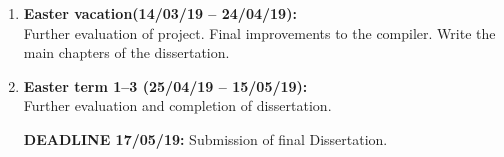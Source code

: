 \documentclass[12pt,a4paper,twoside]{article}
\begin{document}
\begin{enumerate}
\item \textbf{Easter vacation(14/03/19 -- 24/04/19):} \\
Further evaluation of project. Final improvements to the compiler.
Write the main chapters of the dissertation.

\item \textbf{Easter term 1--3 (25/04/19 -- 15/05/19):}  \\
Further evaluation and completion of dissertation.

\textbf{DEADLINE 17/05/19:} Submission of final Dissertation. \\

\end{enumerate}
\end{document}
